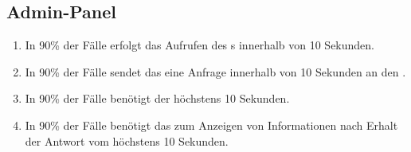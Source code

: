 \subsection{Admin-Panel}

\begin{enumerate}
    \item In 90\% der Fälle erfolgt das Aufrufen des %
    s innerhalb von 10 Sekunden.
    \item In 90\% der Fälle sendet das %
        eine Anfrage innerhalb von 10 Sekunden an den %
        .
    \item In 90\% der Fälle benötigt der %
        höchstens 10 Sekunden.
    \item In 90\% der Fälle benötigt das %
        zum Anzeigen von Informationen nach Erhalt der Antwort vom %
        höchstens 10 Sekunden.
\end{enumerate}